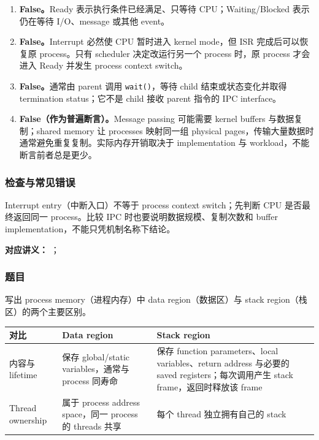 \begin{checkedsolution}
\begin{enumerate}[label=(\alph*)]
  \item \textbf{False。}Ready 表示执行条件已经满足、只等待 CPU；Waiting/Blocked 表示仍在等待 I/O、message 或其他 event。
  \item \textbf{False。}Interrupt 必然使 CPU 暂时进入 kernel mode，但 ISR 完成后可以恢复原 process。只有 scheduler 决定改运行另一个 process 时，原 process 才会进入 Ready 并发生 process context switch。
  \item \textbf{False。}通常由 parent 调用 \texttt{wait()}，等待 child 结束或状态变化并取得 termination status；它不是 child 接收 parent 指令的 IPC interface。
  \item \textbf{False（作为普遍断言）。}Message passing 可能需要 kernel buffers 与数据复制；shared memory 让 processes 映射同一组 physical pages，传输大量数据时通常避免重复复制。实际内存开销取决于 implementation 与 workload，不能断言前者总是更少。
\end{enumerate}
\end{checkedsolution}

\subsubsection*{检查与常见错误}

Interrupt entry（中断入口）不等于 process context switch；先判断 CPU 是否最终返回同一 process。比较 IPC 时也要说明数据规模、复制次数和 buffer implementation，不能只凭机制名称下结论。


\textbf{对应讲义：}
；

\subsubsection*{题目}

写出 process memory（进程内存）中 data region（数据区）与 stack region（栈区）的两个主要区别。

\begin{checkedsolution}
\begin{center}
\small
\begin{tabularx}{0.96\textwidth}{@{}>{\raggedright\arraybackslash}p{2.4cm}>{\raggedright\arraybackslash}X>{\raggedright\arraybackslash}X@{}}
  \toprule
  对比 & Data region & Stack region \\
  \midrule
  内容与 lifetime & 保存 global/static variables，通常与 process 同寿命 & 保存 function parameters、local variables、return address 与必要的 saved registers；每次调用产生 stack frame，返回时释放该 frame \\
  Thread ownership & 属于 process address space，同一 process 的 threads 共享 & 每个 thread 独立拥有自己的 stack \\
  \bottomrule
\end{tabularx}
\end{center}
\end{checkedsolution}

